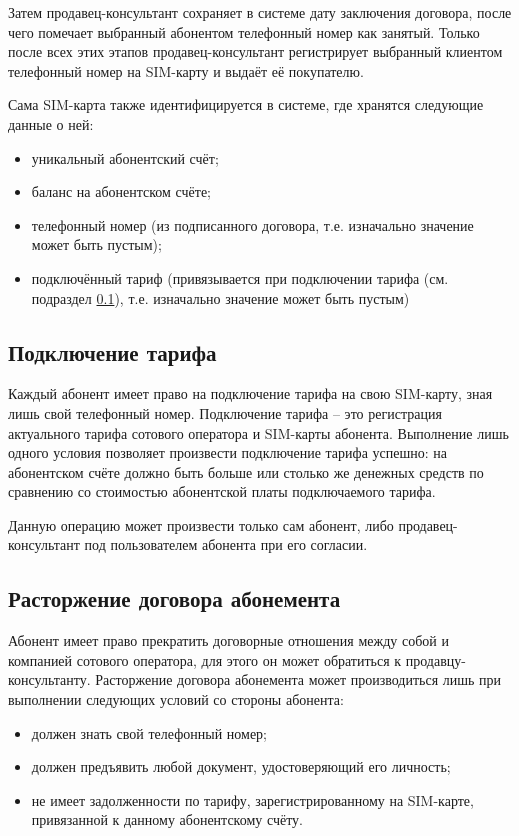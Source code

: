 Затем продавец-консультант сохраняет в системе дату заключения договора, после чего помечает выбранный абонентом телефонный номер как занятый. Только после всех этих этапов продавец-консультант регистрирует выбранный клиентом телефонный номер на SIM-карту и выдаёт её покупателю.

Сама SIM-карта также идентифицируется в системе, где хранятся следующие данные о ней:
\begin{itemize}
    \item уникальный абонентский счёт;
    \item баланс на абонентском счёте;
    \item телефонный номер (из подписанного договора, т.е. изначально значение может быть пустым);
    \item подключённый тариф (привязывается при подключении тарифа (см. подраздел \ref{subsec:tariff-connection}), т.е. изначально значение может быть пустым)
\end{itemize}


\subsection{Подключение тарифа}\label{subsec:tariff-connection}


Каждый абонент имеет право на подключение тарифа на свою SIM-карту, зная лишь свой телефонный номер. Подключение тарифа -- это регистрация актуального тарифа сотового оператора и SIM-карты абонента. Выполнение лишь одного условия позволяет произвести подключение тарифа успешно: на абонентском счёте должно быть больше или столько же денежных средств по сравнению со стоимостью абонентской платы подключаемого тарифа.

Данную операцию может произвести только сам абонент, либо продавец-консультант под пользователем абонента при его согласии.


\subsection{Расторжение договора абонемента}


Абонент имеет право прекратить договорные отношения между собой и компанией сотового оператора, для этого он может обратиться к продавцу-консультанту. Расторжение договора абонемента может производиться лишь при выполнении следующих условий со стороны абонента:
\begin{itemize}
    \item должен знать свой телефонный номер;
    \item должен предъявить любой документ, удостоверяющий его личность;
    \item не имеет задолженности по тарифу, зарегистрированному на SIM-карте, привязанной к данному абонентскому счёту.
\end{itemize} 


